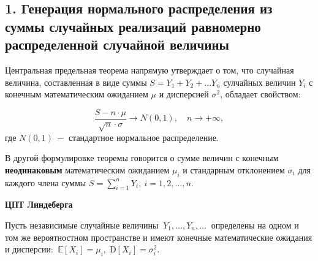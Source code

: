 \documentclass[
]{article}
\begin{document}
\hypertarget{ux433ux435ux43dux435ux440ux430ux446ux438ux44f-ux43dux43eux440ux43cux430ux43bux44cux43dux43eux433ux43e-ux440ux430ux441ux43fux440ux435ux434ux435ux43bux435ux43dux438ux44f-ux438ux437-ux441ux443ux43cux43cux44b-ux441ux43bux443ux447ux430ux439ux43dux44bux445-ux440ux435ux430ux43bux438ux437ux430ux446ux438ux439-ux440ux430ux432ux43dux43eux43cux435ux440ux43dux43e-ux440ux430ux441ux43fux440ux435ux434ux435ux43bux435ux43dux43dux43eux439-ux441ux43bux443ux447ux430ux439ux43dux43eux439-ux432ux435ux43bux438ux447ux438ux43dux44b}{%
\subsection{\texorpdfstring{\textbf{1. Генерация нормального
распределения из суммы случайных реализаций равномерно распределенной
случайной
величины}}{1. Генерация нормального распределения из суммы случайных реализаций равномерно распределенной случайной величины}}\label{ux433ux435ux43dux435ux440ux430ux446ux438ux44f-ux43dux43eux440ux43cux430ux43bux44cux43dux43eux433ux43e-ux440ux430ux441ux43fux440ux435ux434ux435ux43bux435ux43dux438ux44f-ux438ux437-ux441ux443ux43cux43cux44b-ux441ux43bux443ux447ux430ux439ux43dux44bux445-ux440ux435ux430ux43bux438ux437ux430ux446ux438ux439-ux440ux430ux432ux43dux43eux43cux435ux440ux43dux43e-ux440ux430ux441ux43fux440ux435ux434ux435ux43bux435ux43dux43dux43eux439-ux441ux43bux443ux447ux430ux439ux43dux43eux439-ux432ux435ux43bux438ux447ux438ux43dux44b}}

Центральная предельная теорема напрямую утверждает о том, что случайная
величина, составленная в виде суммы \(S = Y_1 + Y_2 + \dots Y_n\)
сулчайных величин \(Y_i\) с конечным математическим ожиданием \(\mu\) и
дисперсией \(\sigma^2\), обладает свойством:

\[
  \frac{S - n\cdot \mu}{\sqrt{n} \cdot \sigma} \to N(0, 1), \quad n\rightarrow +\infty,
\] где \(N(0, 1)\ -\) стандартное нормальное распределение.

В другой формулировке теоремы говорится о сумме величин с конечным
\textbf{неодинаковым} математическим ожиданием \(\mu_i\) и стандарным
отклонением \(\sigma_i\) для каждого члена суммы
\(S = \sum_{i=1}^nY_i, \ i=1,2,\dots, n\).

\textbf{ЦПТ Линдеберга}

Пусть независимые случайные величины \(\ Y_{1},\ldots ,Y_{n},\ldots\ \)
определены на одном и том же вероятностном пространстве и имеют конечные
математические ожидания и дисперсии:
\(\ {\mathbb {E}}[X_{i}]=\mu _{i},\;{\mathrm {D}}[X_{i}]=\sigma _{i}^{2}\).
\end{document}
